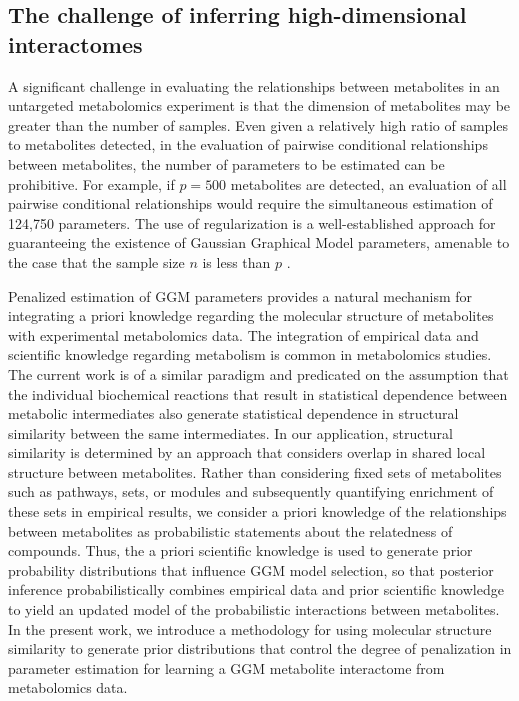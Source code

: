 \begin{DoubleSpace*}
\section{The challenge of inferring high-dimensional interactomes}
A significant challenge in evaluating the relationships between metabolites in an untargeted metabolomics experiment is that the dimension of metabolites may be greater than the number of samples. Even given a relatively high ratio of samples to metabolites detected, in the evaluation of pairwise conditional relationships between metabolites, the number of parameters to be estimated can be prohibitive. For example, if $p=500$ metabolites are detected, an evaluation of all pairwise conditional relationships would require the simultaneous estimation of 124,750 parameters. The use of regularization is a well-established approach for guaranteeing the existence of Gaussian Graphical Model parameters, amenable to the case that the sample size $n$ is less than $p$ \cite{banerjee2008,fan2009,friedman2007,meinshausen2006, yuan2007}.

Penalized estimation of GGM parameters provides a natural mechanism for integrating a priori knowledge regarding the molecular structure of metabolites with experimental metabolomics data. The integration of empirical data and scientific knowledge regarding metabolism is common in metabolomics studies. The current work is of a similar paradigm and predicated on the assumption that the individual biochemical reactions that result in statistical dependence between metabolic intermediates also generate statistical dependence in structural similarity between the same intermediates. In our application, structural similarity is determined by an approach that considers overlap in shared local structure between metabolites. Rather than considering fixed sets of metabolites such as pathways, sets, or modules and subsequently quantifying enrichment of these sets in empirical results, we consider a priori knowledge of the relationships between metabolites as probabilistic statements about the relatedness of compounds. Thus, the a priori scientific knowledge is used to generate prior probability distributions that influence GGM model selection, so that posterior inference probabilistically combines empirical data and prior scientific knowledge to yield an updated model of the probabilistic interactions between metabolites. In the present work, we introduce a methodology for using molecular structure similarity to generate prior distributions that control the degree of penalization in parameter estimation for learning a GGM metabolite interactome from metabolomics data. 
\end{DoubleSpace*}